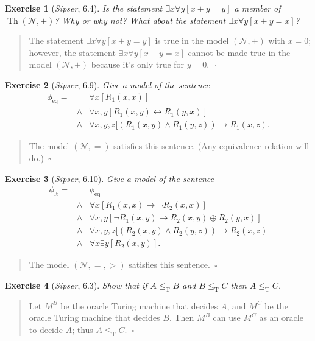 \documentclass{article}
\theoremstyle{break}			%
\newtheorem{exercise}{Exercise}
\theoremstyle{plain}
\newenvironment{answer}{\begin{quotation}\noindent}{\end{quotation}}
\newcommand{\sipser}{\textit{Sipser}}
\newcommand{\qed}{~\ensuremath{\square}}
\newcommand{\Th}{\ensuremath{\operatorname{Th}}}
\newcommand{\Nat}{\ensuremath{\mathcal{N}}}
\newcommand{\tred}{\ensuremath{\leq_{\text{T}}}}
\begin{document}
\begin{exercise}[\sipser, 6.4]
Is the statement $\exists x \forall y [x+y=y]$ a member of
$\Th(\Nat,+)$?  Why or why not?  What about the statement $\exists x
\forall y [x+y=x]$?
\end{exercise}
\begin{answer}
The statement $\exists x \forall y [x+y=y]$ is true in the model
$(\Nat,+)$ with $x=0$; however, the statement
$\exists x \forall y [x+y=x]$ cannot be made true in the model
$(\Nat,+)$ because it's only true for $y=0$.\qed
\end{answer}

\begin{exercise}[\sipser, 6.9]
Give a model of the sentence
\begin{eqnarray*}
\phi_{\text{eq}} =
&       &\forall x [R_1(x,x)] \\
&\wedge &\forall x,y [R_1(x,y) \leftrightarrow R_1(y,x)] \\
&\wedge &\forall x,y,z [(R_1(x,y) \wedge R_1(y,z)) \to R_1(x,z).
\end{eqnarray*}
\end{exercise}
\begin{answer}
The model $(\Nat,=)$ satisfies this sentence.  (Any equivalence
relation will do.)\qed
\end{answer}

\begin{exercise}[\sipser, 6.10]
Give a model of the sentence
\begin{eqnarray*}
\phi_{\text{lt}} =
&	&\phi_{\text{eq}} \\
&\wedge &\forall x [R_1(x,x) \to \neg R_2(x,x)] \\
&\wedge &\forall x,y [\neg R_1(x,y) \to R_2(x,y) \oplus R_2(y,x)] \\
&\wedge &\forall x,y,z [(R_2(x,y) \wedge R_2(y,z)) \to R_2(x,z) \\
&\wedge &\forall x \exists y [R_2(x,y)].
\end{eqnarray*}
\end{exercise}
\begin{answer}
The model $(\Nat,=,>)$ satisfies this sentence.\qed
\end{answer}

\begin{exercise}[\sipser, 6.3]
Show that if $A\tred B$ and $B\tred C$ then $A\tred C$.
\end{exercise}
\begin{answer}
Let $M^B$ be the oracle Turing machine that decides $A$, and $M^C$ be
the oracle Turing machine that decides $B$.  Then $M^B$ can use $M^C$
as an oracle to decide $A$; thus $A\tred C$.\qed
\end{answer}
\end{document}
